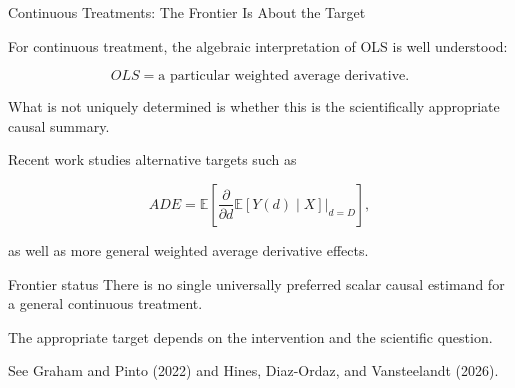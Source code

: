 \documentclass[aspectratio=169,11pt]{beamer}
\begin{document}
\begin{frame}{Continuous Treatments: The Frontier Is About the Target}
\small

For continuous treatment, the algebraic interpretation of OLS is
well understood:

\[
\boxed{
OLS
=
\text{a particular weighted average derivative}.
}
\]

What is \alert{not} uniquely determined is whether this is the
scientifically appropriate causal summary.

\medskip

Recent work studies alternative targets such as

\[
ADE
=
\mathbb{E}
\left[
\frac{\partial}{\partial d}
\mathbb{E}[Y(d)\mid X]
\bigg|_{d=D}
\right],
\]

as well as more general weighted average derivative effects.

\begin{alertblock}{Frontier status}
There is no single universally preferred scalar causal estimand for
a general continuous treatment.

The appropriate target depends on the intervention and the scientific
question.
\end{alertblock}

\scriptsize
See Graham and Pinto (2022) and Hines, Diaz-Ordaz, and Vansteelandt
(2026).

\end{frame}


\end{document}
